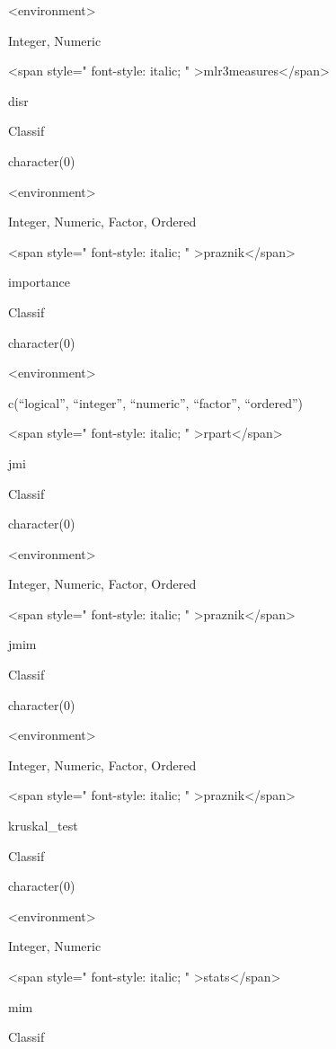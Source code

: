 \documentclass[]{article}
\begin{document}
\textless{}environment\textgreater{}

Integer, Numeric

\textless{}span style=" font-style: italic; " \textgreater{}mlr3measures\textless{}/span\textgreater{}

disr

Classif

character(0)

\textless{}environment\textgreater{}

Integer, Numeric, Factor, Ordered

\textless{}span style=" font-style: italic; " \textgreater{}praznik\textless{}/span\textgreater{}

importance

Classif

character(0)

\textless{}environment\textgreater{}

c(``logical'', ``integer'', ``numeric'', ``factor'', ``ordered'')

\textless{}span style=" font-style: italic; " \textgreater{}rpart\textless{}/span\textgreater{}

jmi

Classif

character(0)

\textless{}environment\textgreater{}

Integer, Numeric, Factor, Ordered

\textless{}span style=" font-style: italic; " \textgreater{}praznik\textless{}/span\textgreater{}

jmim

Classif

character(0)

\textless{}environment\textgreater{}

Integer, Numeric, Factor, Ordered

\textless{}span style=" font-style: italic; " \textgreater{}praznik\textless{}/span\textgreater{}

kruskal\_test

Classif

character(0)

\textless{}environment\textgreater{}

Integer, Numeric

\textless{}span style=" font-style: italic; " \textgreater{}stats\textless{}/span\textgreater{}

mim

Classif
\end{document}
